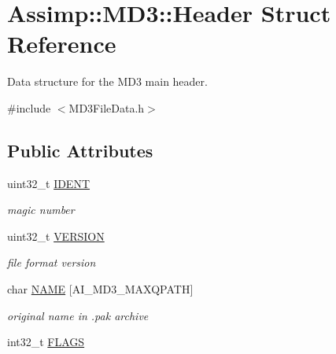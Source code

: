 \hypertarget{struct_assimp_1_1_m_d3_1_1_header}{\section{Assimp\+:\+:M\+D3\+:\+:Header Struct Reference}
\label{struct_assimp_1_1_m_d3_1_1_header}
}


Data structure for the M\+D3 main header.  




{\ttfamily \#include $<$M\+D3\+File\+Data.\+h$>$}

\subsection*{Public Attributes}
\begin{DoxyCompactItemize}
\item 
\hypertarget{struct_assimp_1_1_m_d3_1_1_header_a92c9e7c1e7219ead60146c373cd4f8b2}{uint32\+\_\+t \hyperlink{struct_assimp_1_1_m_d3_1_1_header_a92c9e7c1e7219ead60146c373cd4f8b2}{I\+D\+E\+N\+T}}\label{struct_assimp_1_1_m_d3_1_1_header_a92c9e7c1e7219ead60146c373cd4f8b2}

\begin{DoxyCompactList}\small\item\em magic number \end{DoxyCompactList}\item 
\hypertarget{struct_assimp_1_1_m_d3_1_1_header_a2f759641683f9fd0384b6e7d6d5920de}{uint32\+\_\+t \hyperlink{struct_assimp_1_1_m_d3_1_1_header_a2f759641683f9fd0384b6e7d6d5920de}{V\+E\+R\+S\+I\+O\+N}}\label{struct_assimp_1_1_m_d3_1_1_header_a2f759641683f9fd0384b6e7d6d5920de}

\begin{DoxyCompactList}\small\item\em file format version \end{DoxyCompactList}\item 
\hypertarget{struct_assimp_1_1_m_d3_1_1_header_a50595454c423ffd394ee9ecc628f1c52}{char \hyperlink{struct_assimp_1_1_m_d3_1_1_header_a50595454c423ffd394ee9ecc628f1c52}{N\+A\+M\+E} \mbox{[}A\+I\+\_\+\+M\+D3\+\_\+\+M\+A\+X\+Q\+P\+A\+T\+H\mbox{]}}\label{struct_assimp_1_1_m_d3_1_1_header_a50595454c423ffd394ee9ecc628f1c52}

\begin{DoxyCompactList}\small\item\em original name in .pak archive \end{DoxyCompactList}\item 
\hypertarget{struct_assimp_1_1_m_d3_1_1_header_aab769a43722595409c38cf86ad649d2e}{int32\+\_\+t \hyperlink{struct_assimp_1_1_m_d3_1_1_header_aab769a43722595409c38cf86ad649d2e}{F\+L\+A\+G\+S}}\label{struct_assimp_1_1_m_d3_1_1_header_aab769a43722595409c38cf86ad649d2e}


\end{DoxyCompactItemize}
